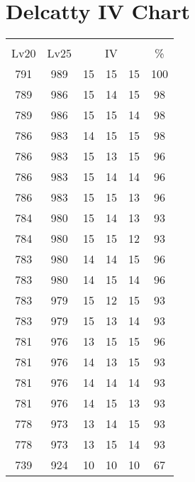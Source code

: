 \documentclass{article}%
\begin{document}
%
\normalsize%
\section{Delcatty IV Chart}%
\label{sec:Delcatty IV Chart}%
\renewcommand{\arraystretch}{1.5}%
\begin{tabular}{|c|c|c|c|c|c|}%
\hline%
\multicolumn{6}{|c|}{\textcolor{white}{ 
\linebreak{Delcatty}
}%
\cellcolor{black}}\\%
\multicolumn{1}{|c}{Lv20}&\multicolumn{1}{c|}{Lv25}&\multicolumn{3}{c|}{IV}&\multicolumn{1}{|c|}{\%}\\%
\hline%
\rowcolor{color100}%
791&989&15&15&15&100\\%
\hline%
\rowcolor{color98}%
789&986&15&14&15&98\\%
\hline%
\rowcolor{color98}%
789&986&15&15&14&98\\%
\hline%
\rowcolor{color98}%
786&983&14&15&15&98\\%
\hline%
\rowcolor{color96}%
786&983&15&13&15&96\\%
\hline%
\rowcolor{color96}%
786&983&15&14&14&96\\%
\hline%
\rowcolor{color96}%
786&983&15&15&13&96\\%
\hline%
\rowcolor{color93}%
784&980&15&14&13&93\\%
\hline%
\rowcolor{color93}%
784&980&15&15&12&93\\%
\hline%
\rowcolor{color96}%
783&980&14&14&15&96\\%
\hline%
\rowcolor{color96}%
783&980&14&15&14&96\\%
\hline%
\rowcolor{color93}%
783&979&15&12&15&93\\%
\hline%
\rowcolor{color93}%
783&979&15&13&14&93\\%
\hline%
\rowcolor{color96}%
781&976&13&15&15&96\\%
\hline%
\rowcolor{color93}%
781&976&14&13&15&93\\%
\hline%
\rowcolor{color93}%
781&976&14&14&14&93\\%
\hline%
\rowcolor{color93}%
781&976&14&15&13&93\\%
\hline%
\rowcolor{color93}%
778&973&13&14&15&93\\%
\hline%
\rowcolor{color93}%
778&973&13&15&14&93\\%
\hline%
\rowcolor{color91}%
739&924&10&10&10&67\\%
\end{tabular}

%
\end{document}
